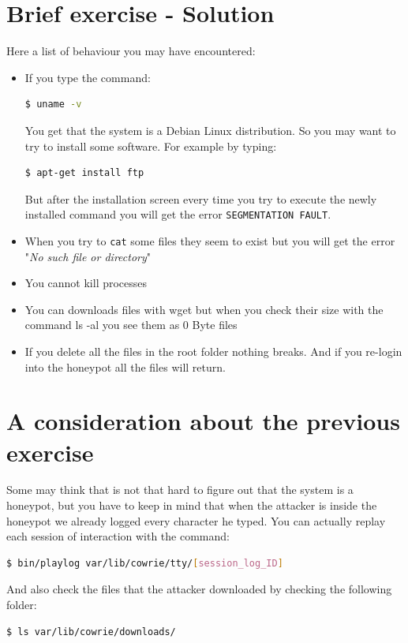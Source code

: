 \documentclass[epsfig,a4paper,11pt,titlepage,oneside,openany]{book}
\begin{document}
\section{Brief exercise - Solution}
Here a list of behaviour you may have encountered:
\begin{itemize}
\itemsep0em 
\item If you type the command:
	\begin{lstlisting}[language=bash]
$ uname -v
	\end{lstlisting}
	You get that the system is a Debian Linux distribution. So you may want to try to install some software. For example by typing:
	\begin{lstlisting}[language=bash]
$ apt-get install ftp 
	\end{lstlisting}
	But after the installation screen every time you try to execute the newly installed command you will get the error \texttt{SEGMENTATION FAULT}.
\item When you try to \texttt{cat} some files they seem to exist but you will get the error "\textit{No such file or directory}"
\item You cannot kill processes
\item You can  downloads  files with wget but when you check their size with the command ls -al you see them as 0 Byte files
\item If you delete all the files in the root folder nothing breaks. And if you re-login into the honeypot all the files will return.
\end{itemize}

\section{A consideration about the previous exercise}
Some may think that is not that hard to figure out that the system is a honeypot, but you have to keep in mind that when the attacker is inside the honeypot we already logged every character he typed.
You can actually replay each session of interaction with the command:
\begin{lstlisting}[language=bash]
$ bin/playlog var/lib/cowrie/tty/[session_log_ID]
\end{lstlisting}
And also check the files that the attacker downloaded by checking the following folder:

\begin{lstlisting}[language=bash]
$ ls var/lib/cowrie/downloads/
\end{lstlisting}
\end{document}
